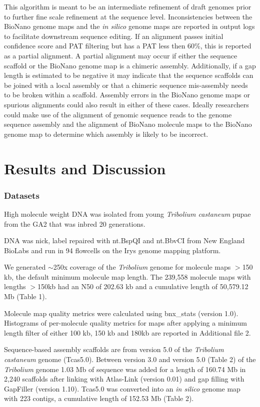 \documentclass{bmcart}
\begin{document}
This algorithm is meant to be an intermediate refinement of draft genomes prior to further fine scale refinement at the sequence level. Inconsistencies between the BioNano genome maps and the \textit{in silico} genome maps are reported in output logs to facilitate downstream sequence editing. If an alignment passes initial confidence score and PAT filtering but has a PAT less then 60\%, this is reported as a partial alignment. A partial alignment may occur if either the sequence scaffold or the BioNano genome map is a chimeric assembly. Additionally, if a gap length is estimated to be negative it may indicate that the sequence scaffolds can be joined with a local assembly or that a chimeric sequence mis-assembly needs to be broken within a scaffold. Assembly errors in the BioNano genome maps or spurious alignments could also result in either of these cases. Ideally researchers could make use of the alignment of genomic sequence reads to the genome sequence assembly and the alignment of BioNano molecule maps to the BioNano genome map to determine which assembly is likely to be incorrect.
 
\section*{Results and Discussion}

\subsubsection*{Datasets}
High molecule weight DNA was isolated from young \textit{Tribolium castaneum} pupae from the GA2 that was inbred 20 generations.


DNA was nick, label repaired with nt.BspQI and nt.BbvCI from New England BioLabs and run in 94 flowcells on the Irys genome mapping platform. 

We generated $\sim$250x coverage of the \textit{Tribolium} genome for molecule maps $>$150 kb, the default minimum molecule map length. The 239,558 molecule maps with lengths $>$150kb had an N50 of 202.63 kb and a cumulative length of 50,579.12 Mb (Table 1). 

Molecule map quality metrics were calculated using bnx\_stats (version 1.0). Histograms of per-molecule quality metrics for maps after applying a minimum length filter of either 100 kb, 150 kb and 180kb are reported in Additional file 2.

Sequence-based assembly scaffolds are from version 5.0 of the \textit{Tribolium castaneum} genome (Tcas5.0). Between version 3.0 \cite{Beetle2008} and version 5.0 (Table 2) of the \textit{Tribolium} genome 1.03 Mb of sequence was added for a length of 160.74 Mb in 2,240 scaffolds after linking with Atlas-Link (version 0.01) and gap filling with GapFiller (version 1.10). Tcas5.0 was converted into an \textit{in silico} genome map with 223 contigs, a cumulative length of 152.53 Mb (Table 2).
\end{document}
